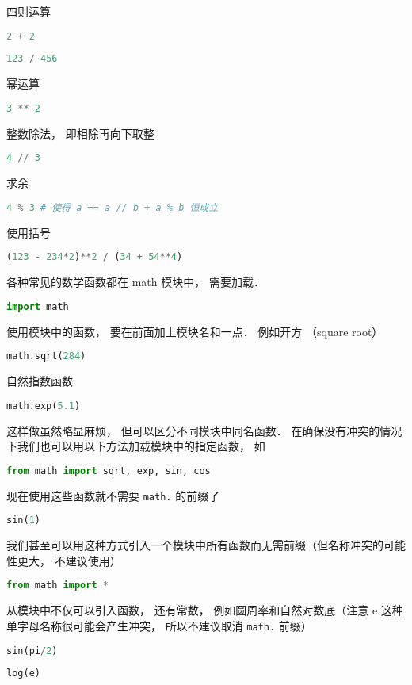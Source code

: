 四则运算
\begin{lstlisting}[language=python]
2 + 2
\end{lstlisting}
\begin{lstlisting}[language=python]
123 / 456
\end{lstlisting}
幂运算
\begin{lstlisting}[language=python]
3 ** 2
\end{lstlisting}
整数除法， 即相除再向下取整
\begin{lstlisting}[language=python]
4 // 3
\end{lstlisting}
求余
\begin{lstlisting}[language=python]
4 % 3 # 使得 a == a // b + a % b 恒成立
\end{lstlisting}
使用括号
\begin{lstlisting}[language=python]
(123 - 234*2)**2 / (34 + 54**4)
\end{lstlisting}
各种常见的数学函数都在 math 模块中， 需要加载．
\begin{lstlisting}[language=python]
import math
\end{lstlisting}
使用模块中的函数， 要在前面加上模块名和一点． 例如开方 （square root）
\begin{lstlisting}[language=python]
math.sqrt(284)
\end{lstlisting}
自然指数函数
\begin{lstlisting}[language=python]
math.exp(5.1)
\end{lstlisting}
这样做虽然略显麻烦， 但可以区分不同模块中同名函数． 在确保没有冲突的情况下我们也可以用以下方法加载模块中的指定函数， 如
\begin{lstlisting}[language=python]
from math import sqrt, exp, sin, cos
\end{lstlisting}
现在使用这些函数就不需要 \verb|math.| 的前缀了
\begin{lstlisting}[language=python]
sin(1)
\end{lstlisting}
我们甚至可以用这种方式引入一个模块中所有函数而无需前缀（但名称冲突的可能性更大， 不建议使用）
\begin{lstlisting}[language=python]
from math import *
\end{lstlisting}
从模块中不仅可以引入函数， 还有常数， 例如圆周率和自然对数底（注意 e 这种单字母名称很可能会产生冲突， 所以不建议取消 \verb|math.| 前缀）
\begin{lstlisting}[language=python]
sin(pi/2)
\end{lstlisting}
\begin{lstlisting}[language=python]
log(e)
\end{lstlisting}

